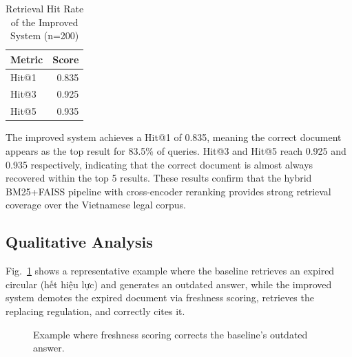 \documentclass[conference]{IEEEtran}
\begin{document}
\begin{table}[h]
\caption{Retrieval Hit Rate of the Improved System (n=200)}
\label{tab:hitrate}
\centering
\begin{tabular}{lr}
\toprule
\textbf{Metric} & \textbf{Score} \\
\midrule
Hit@1 & 0.835 \\
Hit@3 & 0.925 \\
Hit@5 & 0.935 \\
\bottomrule
\end{tabular}
\end{table}

The improved system achieves a Hit@1 of 0.835, meaning the correct document
appears as the top result for 83.5\% of queries. Hit@3 and Hit@5 reach 0.925
and 0.935 respectively, indicating that the correct document is almost always
recovered within the top 5 results. These results confirm that the hybrid
BM25+FAISS pipeline with cross-encoder reranking provides strong retrieval
coverage over the Vietnamese legal corpus.

\subsection{Qualitative Analysis}

Fig.~\ref{fig:example} shows a representative example where the baseline
retrieves an expired circular (hết hiệu lực) and generates an outdated answer,
while the improved system demotes the expired document via freshness scoring,
retrieves the replacing regulation, and correctly cites it.

\begin{figure}[h]
\centering
{}
\caption{Example where freshness scoring corrects the baseline's outdated answer.}
\label{fig:example}
\end{figure}

\end{document}
